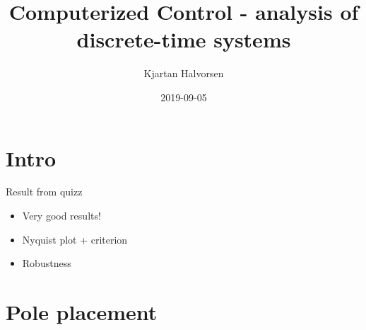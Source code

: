 \documentclass[presentation,aspectratio=169]{beamer}
\author{Kjartan Halvorsen}
\date{2019-09-05}
\title{Computerized Control - analysis of discrete-time systems}
\begin{document}
\maketitle


\section{Intro}
\label{sec-1}
\begin{frame}[label=sec-1-1]{Result from quizz}
\begin{itemize}
\item Very good results!
\item Nyquist plot + criterion
\item Robustness
\end{itemize}
\end{frame}
\section{Pole placement}
\label{sec-2}
\end{document}
